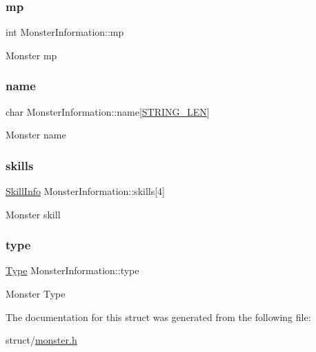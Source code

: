 \subsubsection{\texorpdfstring{mp}{mp}}
{\footnotesize\ttfamily int Monster\+Information\+::mp}

Monster mp \mbox{\label{structMonsterInformation_a58162820b419113b2bf740cfaa8b2cc3}} 
\subsubsection{\texorpdfstring{name}{name}}
{\footnotesize\ttfamily char Monster\+Information\+::name\mbox{[}\hyperlink{user_8h_ad6d94ce273637446121c9cbd16b6077f}{S\+T\+R\+I\+N\+G\+\_\+\+L\+EN}\mbox{]}}

Monster name \mbox{\label{structMonsterInformation_a33f81b5e6dd1b3d450ed5aeb3141cdc2}} 
\subsubsection{\texorpdfstring{skills}{skills}}
{\footnotesize\ttfamily \hyperlink{skill_8h_aa7a27dc845bcc95c786a871b170bf850}{Skill\+Info} Monster\+Information\+::skills\mbox{[}4\mbox{]}}

Monster skill \mbox{\label{structMonsterInformation_abbfcedc38c63f01e7b587de07e00436b}} 
\subsubsection{\texorpdfstring{type}{type}}
{\footnotesize\ttfamily \hyperlink{skill_8h_a1d1cfd8ffb84e947f82999c682b666a7}{Type} Monster\+Information\+::type}

Monster Type 

The documentation for this struct was generated from the following file\+:\begin{DoxyCompactItemize}
\item 
struct/\hyperlink{monster_8h}{monster.\+h}\end{DoxyCompactItemize}
